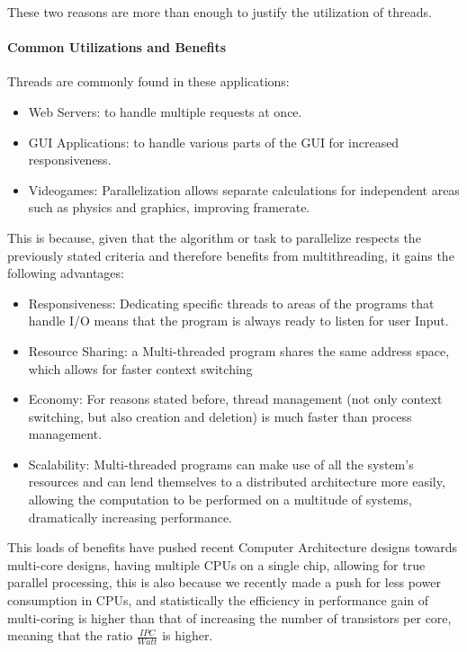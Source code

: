 \documentclass[openright, twoside]{report}
\theoremstyle{definition}
\theoremstyle{example}
\begin{document}
			These two reasons are more than enough to justify the utilization
			of threads.

			\paragraph{Common Utilizations and Benefits}
			Threads are commonly found in these applications:
			\begin{itemize}
				\item Web Servers: to handle multiple requests at once.
				\item GUI Applications: to handle various parts of the GUI for increased 
				responsiveness.
				\item Videogames: Parallelization allows separate calculations for 
				independent areas such as physics and graphics, improving framerate.
			\end{itemize}

			This is because, given that the algorithm or task to parallelize respects the 
			previously stated criteria and therefore benefits from multithreading, it 
			gains the following advantages:

			\begin{itemize}
				\item Responsiveness: Dedicating specific threads to areas of the programs 
				that handle I/O means that the program is always ready to listen for user 
				Input.
				\item Resource Sharing: a Multi-threaded program shares
				the same address space, which allows for faster context switching 
				\item Economy: For reasons stated before, thread management (not only
				context switching, but also creation and deletion) is much faster than
				process management.
				\item Scalability: Multi-threaded programs can make use of all the system's 
				resources and can lend themselves to a distributed architecture more easily,
				allowing the computation to be performed on a multitude of systems, dramatically 
				increasing performance.
			\end{itemize}

			This loads of benefits have pushed recent Computer Architecture designs towards 
			multi-core designs, having multiple CPUs on a single chip, allowing for true 
			parallel processing, this is also because we recently made a push for less power 
			consumption in CPUs, and statistically the efficiency in performance gain
			of multi-coring is higher than that of increasing the number of transistors per core, 
			meaning that the ratio $\frac{IPC}{Watt}$ is higher.
\end{document}
